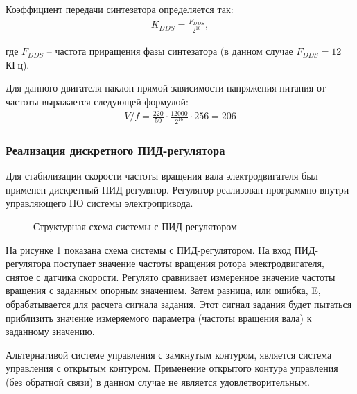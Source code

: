        Коэффициент передачи синтезатора определяется так:
        \begin{gather*}
            K_{DDS} = \frac{F_{DDS}}{2^{16}},
        \end{gather*}

        где $F_{DDS}$ -- частота приращения фазы синтезатора (в данном случае
        $F_{DDS} = 12$ КГц).

        Для данного двигателя наклон прямой зависимости напряжения питания от
        частоты выражается следующей формулой:
        \begin{gather*}
            V/f = \frac{220}{50} \cdot \frac{12000}{2^{16}} \cdot 256 = 206
        \end{gather*}

    \subsubsection{Реализация дискретного ПИД-регулятора}
        Для стабилизации скорости частоты вращения вала электродвигателя был
        применен дискретный ПИД-регулятор. Регулятор реализован программно
        внутри управляющего ПО системы электропривода.

        \begin{figure}[h!]
            \caption{Структурная схема системы с ПИД-регулятором}
            \label{fig:system-with-pid}
        \end{figure}

        На рисунке \ref{fig:system-with-pid} показана схема системы с
        ПИД-регулятором. На вход ПИД-регулятора поступает значение частоты
        вращения ротора электродвигателя, снятое с датчика скорости. Регулято
        сравнивает измеренное значение частоты вращения  с заданным опорным
        значением. Затем разница, или ошибка, E, обрабатывается для расчета
        сигнала задания. Этот сигнал задания будет пытаться приблизить значение
        измеряемого параметра (частоты вращения вала) к заданному значению.

        Альтернативой системе управления с замкнутым контуром, является система
        управления с открытым контуром. Применение открытого контура управления
        (без обратной связи) в данном случае не является удовлетворительным.

